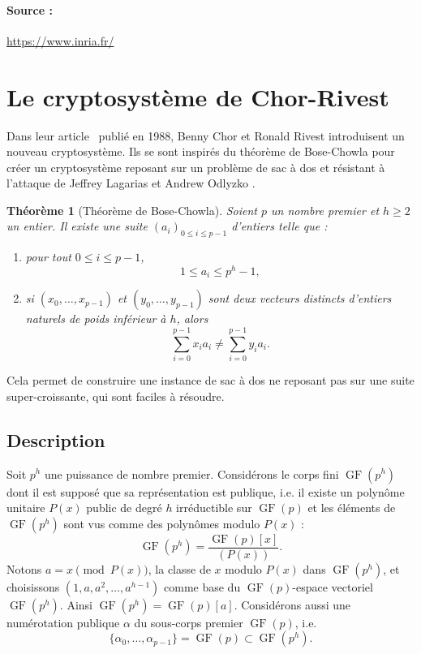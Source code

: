 \documentclass[a4paper, titlepage, 11pt]{article}
\newtheorem{theo}{Théorème}[section]
\theoremstyle{definition}
\theoremstyle{remark}
\def\gf{\operatorname{GF}}
\begin{document}
\paragraph*{Source :} \url{https://www.inria.fr/}

\section{Le cryptosystème de Chor-Rivest}\label{sec:cryptosysteme}

Dans leur article~\cite{chorRivest1988} publié en 1988, Benny Chor et Ronald Rivest introduisent un nouveau cryptosystème. Ils se sont inspirés du théorème de Bose-Chowla \cite{bose1962} pour créer un cryptosystème reposant sur un problème de sac à dos et résistant à l'attaque de Jeffrey Lagarias et Andrew Odlyzko \cite{lagarias1983}.
\begin{theo}[Théorème de Bose-Chowla]
Soient $p$ un nombre premier et $h \geqslant 2$ un entier. Il existe une suite ${(a_i)}_{0\leqslant i \leqslant p-1}$ d'entiers telle que : \begin{enumerate}
\item pour tout $0 \leqslant i \leqslant p-1$, $$1 \leqslant a_i \leqslant p^h-1,$$
\item si $(x_0, \dots, x_{p-1})$ et $(y_0, \dots, y_{p-1})$ sont deux vecteurs distincts d'entiers naturels de poids inférieur à $h$, alors 
$$\sum_{i=0}^{p-1} x_ia_i \neq \sum_{i=0}^{p-1} y_ia_i.$$
\end{enumerate}
\end{theo}

Cela permet de construire une instance de sac à dos ne reposant pas sur une suite super-croissante, qui sont faciles à résoudre.

\subsection{Description}
  
Soit $p^h$ une puissance de nombre premier. Considérons le corps fini $\gf(p^h)$ dont il est supposé que sa représentation est publique, i.e. il existe un polynôme unitaire $P(x)$ public de degré $h$ irréductible sur $\gf(p)$ et les éléments de $\gf(p^h)$ sont vus comme des polynômes modulo $P(x)$ :
$$\gf(p^h) = \frac{\gf(p)[x]}{(P(x))}.$$
Notons $a = x \pmod{P(x)}$, la classe de $x$ modulo $P(x)$ dans $\gf(p^h)$, et choisissons $(1, a, a^2, \dots, a^{h-1})$ comme base du $\gf(p)$-espace vectoriel $\gf(p^h)$. Ainsi $\gf(p^h) = \gf(p)[a]$. Considérons aussi une numérotation publique $\alpha$ du sous-corps premier $\gf(p)$, i.e. $$\{\alpha_0,\dots, \alpha_{p-1}\} = \gf(p) \subset \gf(p^h).$$
\end{document}
